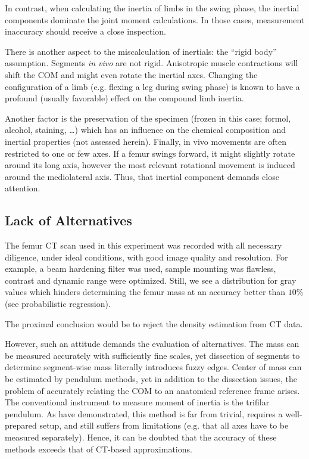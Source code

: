In contrast, when calculating the inertia of limbs in the swing phase, the inertial components dominate the joint moment calculations.
In those cases, measurement inaccuracy should receive a close inspection.


There is another aspect to the miscalculation of inertials: the ``rigid body'' assumption.
Segments \emph{in vivo} are not rigid.
Anisotropic muscle contractions will shift the COM and might even rotate the inertial axes.
Changing the configuration of a limb (e.g. flexing a leg during swing phase) is known to have a profound (usually favorable) effect on the compound limb inertia.

Another factor is the preservation of the specimen (frozen in this case; formol, alcohol, staining, \ldots{}) which has an influence on the chemical composition and inertial properties (not assessed herein).
Finally, in vivo movements are often restricted to one or few axes.
If a femur swings forward, it might slightly rotate around its long axis, however the most relevant rotational movement is induced around the mediolateral axis.
Thus, that inertial component demands close attention.


\subsection{Lack of Alternatives}
\label{sec:org43ff462}
The femur CT scan used in this experiment was recorded with all necessary diligence, under ideal conditions, with good image quality and resolution.
For example, a beam hardening filter was used, sample mounting was flawless, contrast and dynamic range were optimized.
Still, we see a distribution for gray values which hinders determining the femur mass at an accuracy better than \(10\%\) (see probabilistic regression).

The proximal conclusion would be to reject the density estimation from CT data.


However, such an attitude demands the evaluation of alternatives.
The mass can be measured accurately with sufficiently fine scales, yet dissection of segments to determine segment-wise mass literally introduces fuzzy edges.
Center of mass can be estimated by pendulum methods, yet in addition to the dissection issues, the problem of accurately relating the COM to an anatomical reference frame arises.
The conventional instrument to measure moment of inertia is the trifilar pendulum.
As \citet{Durston2022} have demonstrated, this method is far from trivial, requires a well-prepared setup, and still suffers from limitations (e.g. that all axes have to be measured separately).
Hence, it can be doubted that the accuracy of these methods exceeds that of CT-based approximations.

